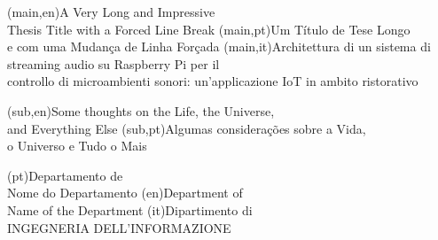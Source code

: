 
%


\nttitle(main,en){A Very Long and Impressive\\Thesis Title with a Forced Line Break}%
\nttitle(main,pt){Um Título de Tese Longo\\e com uma Mudança de Linha Forçada}%
\nttitle(main,it){Architettura di un sistema di streaming audio su Raspberry Pi per il\\controllo di microambienti sonori: un'applicazione IoT in ambito ristorativo}%

\nttitle(sub,en){Some thoughts on the Life, the Universe,\\and Everything Else}%
\nttitle(sub,pt){Algumas considerações sobre a Vida,\\o Universo e Tudo o Mais}%


\ntdepartment*(pt){Departamento de\\Nome do Departamento}
\ntdepartment*(en){Department of\\Name of the Department}
\ntdepartment*(it){Dipartimento di\\INGEGNERIA DELL'INFORMAZIONE}

